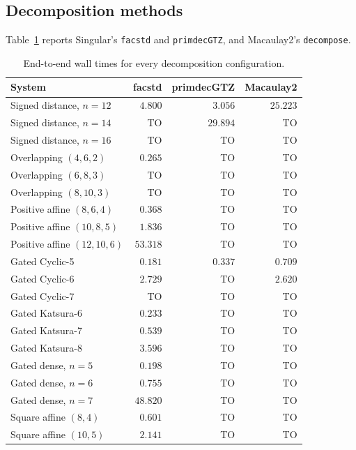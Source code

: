 \subsection{Decomposition methods}

Table~\ref{tab:appendix-decomposition} reports Singular's \texttt{facstd} and
\texttt{primdecGTZ}, and Macaulay2's \texttt{decompose}.

\begin{table}[pos=htbp]
\centering
\caption{End-to-end wall times for every decomposition configuration.}
\label{tab:appendix-decomposition}
\small
\setlength{\tabcolsep}{4pt}
\begin{tabular}{l r r r}
\hline
System & facstd & primdecGTZ & Macaulay2 \\
\hline
Signed distance, $n=12$ & $4.800$ & $3.056$ & $25.223$ \\
Signed distance, $n=14$ & TO & $29.894$ & TO \\
Signed distance, $n=16$ & TO & TO & TO \\
Overlapping $(4,6,2)$ & $0.265$ & TO & TO \\
Overlapping $(6,8,3)$ & TO & TO & TO \\
Overlapping $(8,10,3)$ & TO & TO & TO \\
Positive affine $(8,6,4)$ & $0.368$ & TO & TO \\
Positive affine $(10,8,5)$ & $1.836$ & TO & TO \\
Positive affine $(12,10,6)$ & $53.318$ & TO & TO \\
Gated Cyclic-5 & $0.181$ & $0.337$ & $0.709$ \\
Gated Cyclic-6 & $2.729$ & TO & $2.620$ \\
Gated Cyclic-7 & TO & TO & TO \\
Gated Katsura-6 & $0.233$ & TO & TO \\
Gated Katsura-7 & $0.539$ & TO & TO \\
Gated Katsura-8 & $3.596$ & TO & TO \\
Gated dense, $n=5$ & $0.198$ & TO & TO \\
Gated dense, $n=6$ & $0.755$ & TO & TO \\
Gated dense, $n=7$ & $48.820$ & TO & TO \\
Square affine $(8,4)$ & $0.601$ & TO & TO \\
Square affine $(10,5)$ & $2.141$ & TO & TO \\
\hline
\end{tabular}
\end{table}

